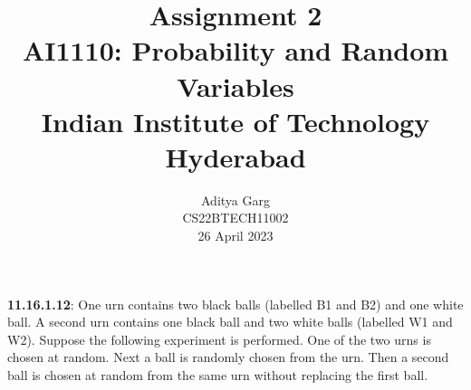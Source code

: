 \documentclass[journal,12pt,twocolumn]{IEEEtran}
\providecommand{\pr}[1]{\ensuremath{\Pr\left(#1\right)}}
\providecommand{\cbrak}[1]{\ensuremath{\left\{#1\right\}}}
\begin{document}
\newtheorem{theorem}{Theorem}[section]
\newtheorem{problem}{Problem}
\newtheorem{proposition}{Proposition}[section]
\newtheorem{lemma}{Lemma}[section]
\newtheorem{corollary}[theorem]{Corollary}
\newtheorem{example}{Example}[section]
\newtheorem{definition}[problem]{Definition}
\newcommand{\BEQA}{\begin{eqnarray}}
\newcommand{\EEQA}{\end{eqnarray}}
\newcommand{\define}{\stackrel{\triangle}{=}}
\newcommand{\xor}{\oplus}


\providecommand{\mbf}{\mathbf}
\providecommand{\pr}[1]{\ensuremath{\Pr\left(#1\right)}}
\providecommand{\qfunc}[1]{\ensuremath{Q\left(#1\right)}}
\providecommand{\sbrak}[1]{\ensuremath{{}\left[#1\right]}}
\providecommand{\lsbrak}[1]{\ensuremath{{}\left[#1\right.}}
\providecommand{\rsbrak}[1]{\ensuremath{{}\left.#1\right]}}
\providecommand{\brak}[1]{\ensuremath{\left(#1\right)}}
\providecommand{\lbrak}[1]{\ensuremath{\left(#1\right.}}
\providecommand{\rbrak}[1]{\ensuremath{\left.#1\right)}}
\providecommand{\cbrak}[1]{\ensuremath{\left\{#1\right\}}}
\providecommand{\lcbrak}[1]{\ensuremath{\left\{#1\right.}}
\providecommand{\rcbrak}[1]{\ensuremath{\left.#1\right\}}}
\theoremstyle{remark}
\newtheorem{rem}{Remark}
\newcommand{\sgn}{\mathop{\mathrm{sgn}}}

\newcommand{\solution}{\noindent \textbf{Solution: }}
\newcommand{\cosec}{\,\text{cosec}\,}
\providecommand{\dec}[2]{\ensuremath{\overset{#1}{\underset{#2}{\gtrless}}}}
\newcommand{\myvec}[1]{\ensuremath{\begin{pmatrix}#1\end{pmatrix}}}
\newcommand{\mydet}[1]{\ensuremath{\begin{vmatrix}#1\end{vmatrix}}}

\let\vec\mathbf


\vspace{3cm}

\title{
   Assignment 2\\ \Large AI1110: Probability and Random Variables \\ \large Indian Institute of Technology Hyderabad
}
\author{ Aditya Garg \\ CS22BTECH11002 \\ 26 April 2023	
	
}	
\maketitle
\newpage
\bigskip
\renewcommand{\thefigure}{\theenumi}
\renewcommand{\thetable}{\theenumi}
\renewcommand{\thetable}{\arabic{table}}  
\textbf{11.16.1.12}:
One urn contains two black balls (labelled B1 and B2) and one white ball. A
second urn contains one black ball and two white balls (labelled W1 and W2).
Suppose the following experiment is performed. One of the two urns is chosen
at random. Next a ball is randomly chosen from the urn. Then a second ball is
chosen at random from the same urn without replacing the first ball.
\end{document}
